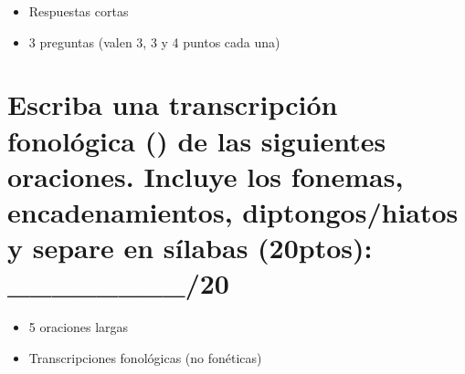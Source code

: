 \documentclass[12pt]{exam}
\begin{document}
\begin{itemize}
	\item Respuestas cortas
	\item 3 preguntas (valen 3, 3 y 4 puntos cada una)
\end{itemize}

\vspace{.2in}

\section{Escriba una transcripción fonológica () de las siguientes oraciones. Incluye los fonemas, encadenamientos, diptongos/hiatos y separe en sílabas (20ptos): \_\_\_\_\_\_\_\_/20 }

\begin{itemize}
	\item 5 oraciones largas
	\item Transcripciones fonológicas (no fonéticas)
\end{itemize}
\end{document}
